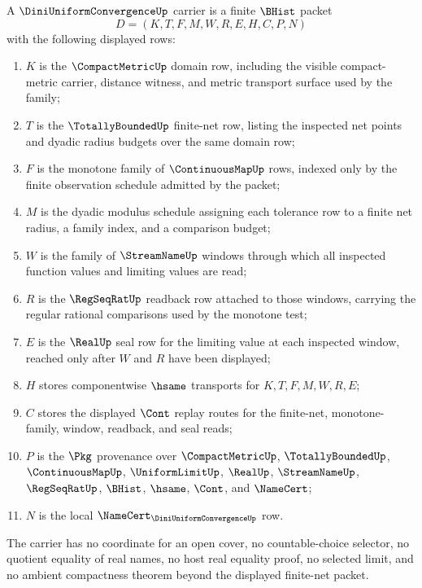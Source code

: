 \begin{definition}
\label{def:diniuniformconvergence-carrier}
A $\DiniUniformConvergenceUp$ carrier is a finite $\BHist$ packet
$$
D=(K,T,F,M,W,R,E,H,C,P,N)
$$
with the following displayed rows:
\begin{enumerate}
\item $K$ is the $\CompactMetricUp$ domain row, including the visible compact-metric carrier, distance witness, and metric transport surface used by the family;
\item $T$ is the $\TotallyBoundedUp$ finite-net row, listing the inspected net points and dyadic radius budgets over the same domain row;
\item $F$ is the monotone family of $\ContinuousMapUp$ rows, indexed only by the finite observation schedule admitted by the packet;
\item $M$ is the dyadic modulus schedule assigning each tolerance row to a finite net radius, a family index, and a comparison budget;
\item $W$ is the family of $\StreamNameUp$ windows through which all inspected function values and limiting values are read;
\item $R$ is the $\RegSeqRatUp$ readback row attached to those windows, carrying the regular rational comparisons used by the monotone test;
\item $E$ is the $\RealUp$ seal row for the limiting value at each inspected window, reached only after $W$ and $R$ have been displayed;
\item $H$ stores componentwise $\hsame$ transports for $K,T,F,M,W,R,E$;
\item $C$ stores the displayed $\Cont$ replay routes for the finite-net, monotone-family, window, readback, and seal reads;
\item $P$ is the $\Pkg$ provenance over $\CompactMetricUp$, $\TotallyBoundedUp$, $\ContinuousMapUp$, $\UniformLimitUp$, $\RealUp$, $\StreamNameUp$, $\RegSeqRatUp$, $\BHist$, $\hsame$, $\Cont$, and $\NameCert$;
\item $N$ is the local $\NameCert_{\DiniUniformConvergenceUp}$ row.
\end{enumerate}
The carrier has no coordinate for an open cover, no countable-choice selector, no quotient equality of real names, no host real equality proof, no selected limit, and no ambient compactness theorem beyond the displayed finite-net packet.
\end{definition}

